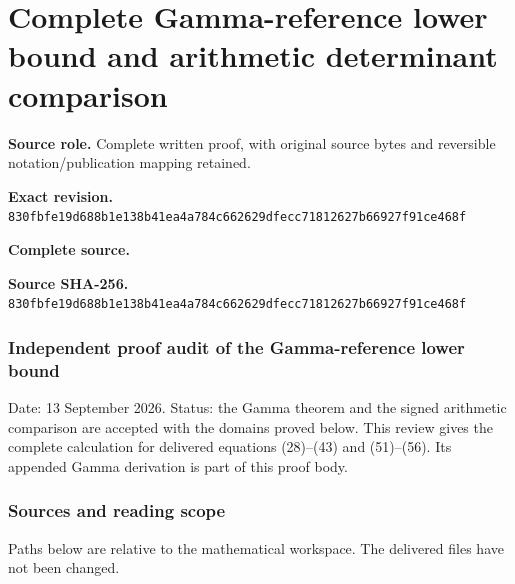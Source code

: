\begingroup

\section{Complete Gamma-reference lower bound and arithmetic determinant comparison}


\begingroup
\sloppy
\small

\noindent\textbf{Source role.} Complete written proof, with original source bytes and reversible notation/publication mapping retained.\par
\noindent\textbf{Exact revision.} \nolinkurl{830fbfe19d688b1e138b41ea4a784c662629dfecc71812627b66927f91ce468f}\par
\noindent\textbf{Complete source.} \par
\noindent\textbf{Source SHA-256.} \nolinkurl{830fbfe19d688b1e138b41ea4a784c662629dfecc71812627b66927f91ce468f}\par\medskip
\subsubsection{Independent proof audit of the Gamma-reference lower bound}\label{GraphV2:endpoint-gamma_review--independent-proof-audit-of-the-gamma-reference-lower-bound}

Date: 13 September 2026. Status: the Gamma theorem and the signed arithmetic comparison are accepted with the domains proved below. This review gives the complete calculation for delivered equations (28)--(43) and (51)--(56). Its appended Gamma derivation is part of this proof body.

\subsubsection{Sources and reading scope}\label{GraphV2:endpoint-gamma_review--sources-and-reading-scope}

Paths below are relative to the mathematical workspace. The delivered files have not been changed.

